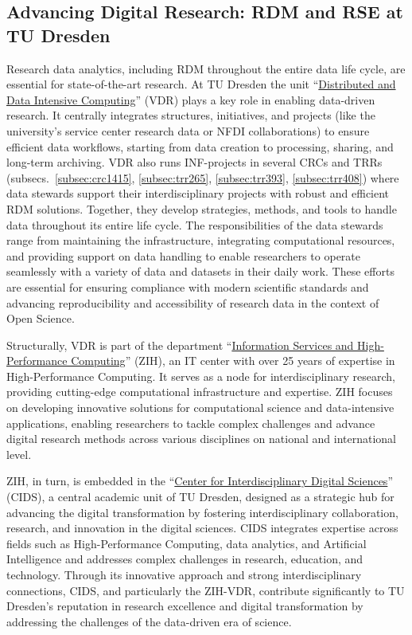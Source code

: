 \documentclass{eceasst}
\begin{document}
\subsection{Advancing Digital Research: RDM and RSE at TU Dresden}
\label{subsec:vdr}
Research data analytics, including RDM throughout the entire data life cycle, are essential for state-of-the-art research.
At TU Dresden the unit ``\href{https://tu-dresden.de/zih/forschung/datenintensives_rechnen}{Distributed and Data Intensive Computing}'' (VDR) plays a key role in enabling data-driven research.
It centrally integrates structures, initiatives, and projects (like the university’s service center research data or NFDI collaborations)
to ensure efficient data workflows, starting from data creation to processing, sharing, and long-term archiving.
VDR also runs INF-projects in several CRCs and TRRs (subsecs.~\ref{subsec:crc1415}, \ref{subsec:trr265}, \ref{subsec:trr393}, \ref{subsec:trr408}) where data stewards support their interdisciplinary projects with robust and
efficient RDM solutions.
Together, they develop strategies, methods, and tools to handle data throughout its entire life cycle.
The responsibilities of the data stewards range from maintaining the infrastructure, integrating computational resources,
and providing support on data handling to enable researchers to operate seamlessly with a variety of data and datasets in their daily work.
These efforts are essential for ensuring compliance with modern scientific standards and advancing reproducibility and accessibility
 of research data in the context of Open Science.

Structurally, VDR is part of the department ``\href{https://tu-dresden.de/zih}{Information Services and High-Performance Computing}'' (ZIH), an IT center with over 25 years of expertise in High-Performance Computing.
It serves as a node for interdisciplinary research, providing cutting-edge computational infrastructure and expertise.
ZIH focuses on developing innovative solutions for computational science and data-intensive applications,
enabling researchers to tackle complex challenges and advance digital research methods across various disciplines on national and international level.

ZIH, in turn, is embedded in the ``\href{https://tu-dresden.de/cids}{Center for Interdisciplinary Digital Sciences}'' (CIDS), a central academic unit of TU Dresden, designed as a
strategic hub for advancing the digital transformation by fostering interdisciplinary collaboration, research, and innovation in the digital sciences.
CIDS integrates expertise across fields such as High-Performance Computing, data analytics, and Artificial Intelligence and addresses complex challenges in research, education, and technology.
Through its innovative approach and strong interdisciplinary connections, CIDS, and particularly the ZIH-VDR, contribute significantly
to TU Dresden’s reputation in research excellence and digital transformation by addressing the challenges of the data-driven era of science.
\end{document}
